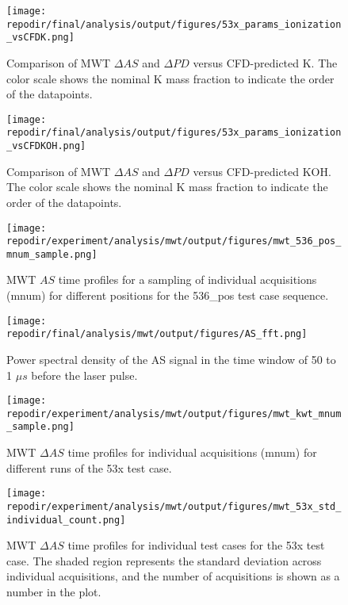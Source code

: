 \begin{figure}[h]
    \centering
    \texttt{[image: \\repodir/final/analysis/output/figures/53x\_params\_ionization\_vsCFDK.png]} 
    \caption{Comparison of MWT $\Delta AS$ and $\Delta PD$ versus CFD-predicted K. The color scale shows the nominal K mass fraction to indicate the order of the datapoints.}
    \label{fig:SI_53x_params_ionization_vsCFDK}
\end{figure}

\begin{figure}[h]
    \centering
    \texttt{[image: \\repodir/final/analysis/output/figures/53x\_params\_ionization\_vsCFDKOH.png]} 
    \caption{Comparison of MWT $\Delta AS$ and $\Delta PD$ versus CFD-predicted KOH. The color scale shows the nominal K mass fraction to indicate the order of the datapoints.}
    \label{fig:SI_53x_params_ionization_vsCFDKOH}
\end{figure}



\begin{figure}[]
\centering
\texttt{[image: \\repodir/experiment/analysis/mwt/output/figures/mwt\_536\_pos\_mnum\_sample.png]}
\caption{MWT $AS$ time profiles for a sampling of individual acquisitions (mnum) for different positions for the 536\_pos test case sequence.}
\label{fig:SI_mwt_536_pos_mnum_sample}
\end{figure}

\begin{figure}
    \centering
    \texttt{[image: \\repodir/final/analysis/mwt/output/figures/AS\_fft.png]} 
    \caption{Power spectral density of the AS signal in the time window of 50 to 1 $\mu s$ before the laser pulse.}
    \label{fig:SI_AS_fft}
\end{figure}

\begin{figure}
    \centering
    \texttt{[image: \\repodir/experiment/analysis/mwt/output/figures/mwt\_kwt\_mnum\_sample.png]} 
    \caption{MWT $\Delta AS$ time profiles for individual acquisitions (mnum) for different runs of the 53x test case.  }
    \label{fig:SI_mwt_kwt_mnum_sample}
\end{figure}

\begin{figure}
    \centering
    \texttt{[image: \\repodir/experiment/analysis/mwt/output/figures/mwt\_53x\_std\_individual\_count.png]} 
    \caption{MWT $\Delta AS$ time profiles for individual test cases for the 53x test case. The shaded region represents the standard deviation across individual acquisitions, and the number of acquisitions is shown as a number in the plot.}
    \label{fig:SI_mwt_53x_std_individual_count}
\end{figure}

